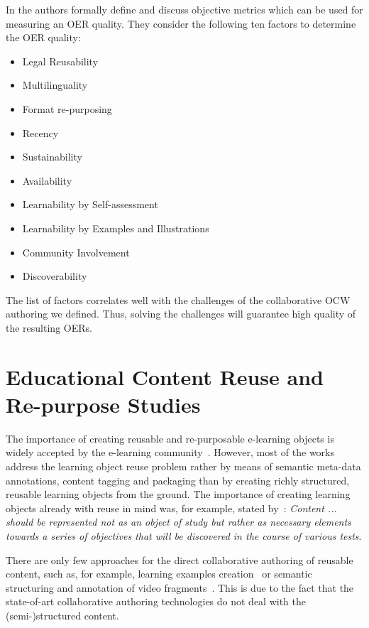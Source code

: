 \documentclass[ngerman,UKenglish,table]{scrbook}
\begin{document}
In \cite{sahar_vahdati_2015_14756} the authors formally define and discuss objective metrics which can be used for measuring an OER quality. 
They consider the following ten factors to determine the OER quality:
\begin{itemize}
\item Legal Reusability
\item Multilinguality
\item Format re-purposing
\item Recency
\item Sustainability
\item Availability
\item Learnability by Self-assessment
\item Learnability by Examples and Illustrations
\item Community Involvement
\item Discoverability
\end{itemize}

The list of factors correlates well with the challenges of the collaborative OCW authoring we defined. 
Thus, solving the challenges will guarantee high quality of the resulting OERs.


\section{Educational Content Reuse and Re-purpose Studies}
\label{sec:state_of_art_reuse}

The importance of creating reusable and re-purposable e-learning objects is widely accepted by the e-learning community~\cite{Devedzic:2006:SWE:1177224}.
However, most of the works address the learning object reuse problem rather by means of semantic meta-data annotations, content tagging and packaging than by creating richly structured, reusable learning objects from the ground.
The importance of creating learning objects already with reuse in mind was, for example, stated by~\cite{DBLP:reference/ai/PedreiraSC09}: \emph{Content ... should be represented not as an object of study but rather as necessary elements towards a series of objectives that will be discovered in the course of various tests}.


There are only few approaches for the direct collaborative authoring of reusable content, such as, for example, learning examples creation~\cite{DBLP:conf/iadis/KuoTKHLC08} or semantic structuring and annotation of video fragments~\cite{DBLP:journals/ile/BarriocanalSAL11}.
This is due to the fact that the state-of-art collaborative authoring technologies do not deal with the (semi-)structured content.
\end{document}
